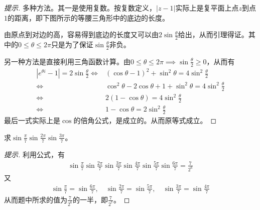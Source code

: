   \begin{proof}[提示]
   多种方法。其一是使用复数。按复数定义，$\left| z - 1\right|$实际上是复平面上点$z$到点$1$的距离，即下图所示的等腰三角形中的底边的长度。
   \begin{center}
   \end{center}
   由原点到对边的高，容易得到底边的长度又可以由$2\sin\frac{\theta}{2}$给出，从而引理得证。其中的$0\le\theta\le2\pi$只是为了保证$\sin\frac\theta2$非负。

   另一种方法是直接利用三角函数计算。由$0\le\theta\le2\pi\implies \sin\frac\theta2\ge0$，从而有
   \begin{align*}
     \left| e^{\theta i} - 1 \right| = 2\sin\frac\theta2 \iff{} & (\cos\theta - 1)^2 + \sin^2\theta = 4\sin^2\frac\theta 2\\
     \iff{} & \cos^2\theta - 2\cos\theta + 1 + \sin^2\theta = 4\sin^2\frac\theta2\\
     \iff{} & 2(1-\cos\theta)=4\sin^2\frac\theta2\\
     \iff{} & 1-\cos\theta = 2\sin^2\frac\theta2                                                                  
   \end{align*}
   最后一式实际上是$\cos$的倍角公式，是成立的。从而原等式成立。
 \end{proof}

 \begin{example}
   求$\sin\frac\pi7 \sin\frac{2\pi}7 \sin\frac{3\pi}7$。
 \end{example}
 \begin{proof}[提示]
   利用公式，有
   \begin{align*}
     \sin\frac\pi7 \sin\frac{2\pi}7 \sin\frac{3\pi}7 \sin\frac{4\pi}7 \sin\frac{5\pi}7 \sin\frac{6\pi}7 =\frac{7}{2^6}
   \end{align*}
   又
   \begin{align*}
     \sin\frac\pi7 = \sin\frac{6\pi}7,\quad
     \sin\frac{2\pi}7 = \sin\frac{5\pi}7,\quad
     \sin\frac{3\pi}7 = \sin\frac{4\pi}7
   \end{align*}
   从而题中所求的值为$\frac{7}{2^6}$的一半，即$\frac{7}{2^7}$。
 \end{proof}

